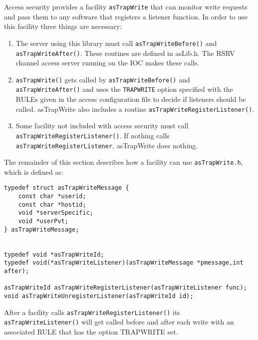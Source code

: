 Access security provides a facility \verb|asTrapWrite| that can monitor write requests and pass them to any software that registers a listener function.
In order to use this facility three things are necessary:

\begin{enumerate}
\item The server using this library must call \verb|asTrapWriteBefore()| and \verb|asTrapWriteAfter()|.
These routines are defined in asLib.h.
The RSRV channel access server running on the IOC makes these calls.

\item \verb|asTrapWrite()| gets called by \verb|asTrapWriteBefore()| and\verb| asTrapWriteAfter()| and uses the \verb|TRAPWRITE| option specified with the RULEs given in the access configuration file to decide if listeners should be called.
asTrapWrite also includes a routine \verb|asTrapWriteRegisterListener()|.

\item Some facility not included with access security must call \verb|asTrapWriteRegisterListener()|.
If nothing calls \verb|asTrapWriteRegisterListener|, asTrapWrite does nothing.

\end{enumerate}

The remainder of this section describes how a facility can use \verb|asTrapWrite.h|, which is defined as:

\begin{verbatim}
typedef struct asTrapWriteMessage {
    const char *userid;
    const char *hostid;
    void *serverSpecific;
    void *userPvt;
} asTrapWriteMessage;


typedef void *asTrapWriteId;
typedef void(*asTrapWriteListener)(asTrapWriteMessage *pmessage,int after);

asTrapWriteId asTrapWriteRegisterListener(asTrapWriteListener func);
void asTrapWriteUnregisterListener(asTrapWriteId id);
\end{verbatim}

After a facility calls \verb|asTrapWriteRegisterListener()| its \verb|asTrapWriteListener()| will get called before 
and after each write with an associated RULE that has the option TRAPWRITE  set.

